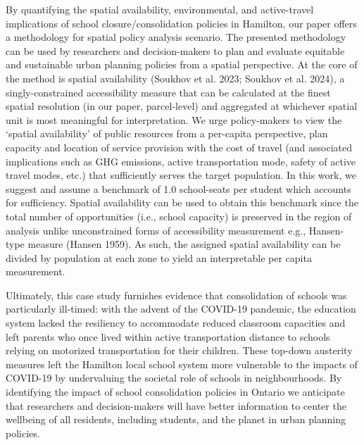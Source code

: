 \documentclass[
default
]{sn-jnl}
\begin{document}
By quantifying the spatial availability, environmental, and
active-travel implications of school closure/consolidation policies in
Hamilton, our paper offers a methodology for spatial policy analysis
scenario. The presented methodology can be used by researchers and
decision-makers to plan and evaluate equitable and sustainable urban
planning policies from a spatial perspective. At the core of the method
is spatial availability (Soukhov et al. 2023; Soukhov et al. 2024), a
singly-constrained accessibility measure that can be calculated at the
finest spatial resolution (in our paper, parcel-level) and aggregated at
whichever spatial unit is most meaningful for interpretation. We urge
policy-makers to view the `spatial availability' of public resources
from a per-capita perspective, plan capacity and location of service
provision with the cost of travel (and associated implications such as
GHG emissions, active transportation mode, safety of active travel
modes, etc.) that sufficiently serves the target population. In this
work, we suggest and assume a benchmark of 1.0 school-seats per student
which accounts for sufficiency. Spatial availability can be used to
obtain this benchmark since the total number of opportunities (i.e.,
school capacity) is preserved in the region of analysis unlike
unconstrained forms of accessibility measurement e.g., Hansen-type
measure (Hansen 1959). As such, the assigned spatial availability can be
divided by population at each zone to yield an interpretable per capita
measurement.

Ultimately, this case study furnishes evidence that consolidation of
schools was particularly ill-timed: with the advent of the COVID-19
pandemic, the education system lacked the resiliency to accommodate
reduced classroom capacities and left parents who once lived within
active transportation distance to schools relying on motorized
transportation for their children. These top-down austerity measures
left the Hamilton local school system more vulnerable to the impacts of
COVID-19 by undervaluing the societal role of schools in neighbourhoods.
By identifying the impact of school consolidation policies in Ontario we
anticipate that researchers and decision-makers will have better
information to center the wellbeing of all residents, including
students, and the planet in urban planning policies.
\end{document}
